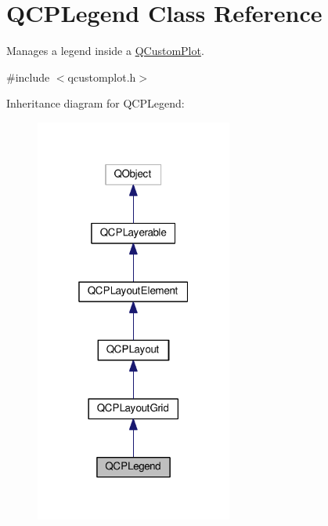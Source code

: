 \hypertarget{classQCPLegend}{}\section{Q\+C\+P\+Legend Class Reference}
\label{classQCPLegend}


Manages a legend inside a \hyperlink{classQCustomPlot}{Q\+Custom\+Plot}.  




{\ttfamily \#include $<$qcustomplot.\+h$>$}



Inheritance diagram for Q\+C\+P\+Legend\+:
\nopagebreak
\begin{figure}[H]
\begin{center}
\leavevmode
\includegraphics[width=184pt]{classQCPLegend__inherit__graph}
\end{center}
\end{figure}


